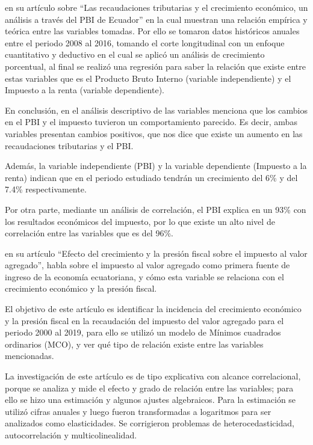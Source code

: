 \documentclass[
  letterpaper,
  DIV=11,
  numbers=noendperiod]{scrartcl}
\begin{document}
\textcite{ronquillo_recaudaciones_2017} en su artículo sobre ``Las
recaudaciones tributarias y el crecimiento económico, un análisis a
través del PBI de Ecuador'' en la cual muestran una relación empírica y
teórica entre las variables tomadas. Por ello se tomaron datos
históricos anuales entre el periodo 2008 al 2016, tomando el corte
longitudinal con un enfoque cuantitativo y deductivo en el cual se
aplicó un análisis de crecimiento porcentual, al final se realizó una
regresión para saber la relación que existe entre estas variables que es
el Producto Bruto Interno (variable independiente) y el Impuesto a la
renta (variable dependiente).

En conclusión, en el análisis descriptivo de las variables menciona que
los cambios en el PBI y el impuesto tuvieron un comportamiento parecido.
Es decir, ambas variables presentan cambios positivos, que nos dice que
existe un aumento en las recaudaciones tributarias y el PBI.

Además, la variable independiente (PBI) y la variable dependiente
(Impuesto a la renta) indican que en el periodo estudiado tendrán un
crecimiento del 6\% y del 7.4\% respectivamente.

Por otra parte, mediante un análisis de correlación, el PBI explica en
un 93\% con los resultados económicos del impuesto, por lo que existe un
alto nivel de correlación entre las variables que es del 96\%.

\textcite{cacay_cacay_efecto_2021} en su artículo ``Efecto del
crecimiento y la presión fiscal sobre el impuesto al valor agregado'',
habla sobre el impuesto al valor agregado como primera fuente de ingreso
de la economía ecuatoriana, y cómo esta variable se relaciona con el
crecimiento económico y la presión fiscal.

El objetivo de este artículo es identificar la incidencia del
crecimiento económico y la presión fiscal en la recaudación del impuesto
del valor agregado para el periodo 2000 al 2019, para ello se utilizó un
modelo de Mínimos cuadrados ordinarios (MCO), y ver qué tipo de relación
existe entre las variables mencionadas.

La investigación de este artículo es de tipo explicativa con alcance
correlacional, porque se analiza y mide el efecto y grado de relación
entre las variables; para ello se hizo una estimación y algunos ajustes
algebraicos. Para la estimación se utilizó cifras anuales y luego fueron
transformadas a logaritmos para ser analizados como elasticidades. Se
corrigieron problemas de heterocedasticidad, autocorrelación y
multicolinealidad.
\end{document}
